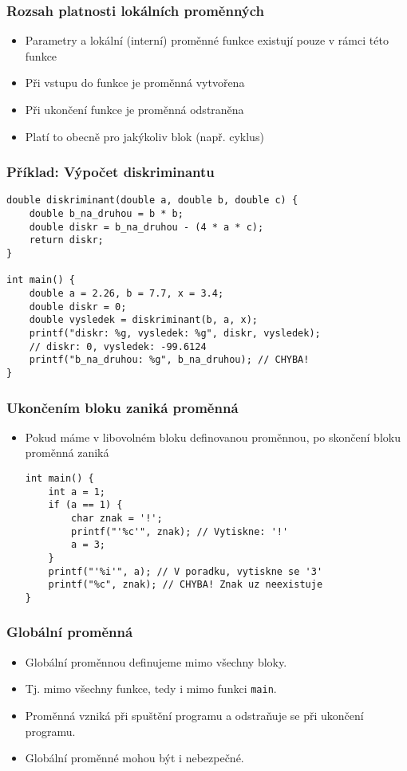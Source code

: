 \documentclass{beamer}
\newenvironment{itemizex}%
  {\large \begin{itemize}%
    \setlength{\itemsep}{8pt}%
    \setlength{\parskip}{8pt}}%
  {\end{itemize}}
\begin{document}
\begin{frame}[t,fragile]\frametitle{Rozsah platnosti lokálních proměnných} 
    \begin{itemizex}
        \item Parametry a lokální (interní) proměnné funkce existují pouze v rámci této funkce
        \item Při vstupu do funkce je proměnná vytvořena
        \item Při ukončení funkce je proměnná odstraněna
        \item Platí to obecně pro jakýkoliv blok (např. cyklus)
    \end{itemizex}
\end{frame}

\begin{frame}[t,fragile]\frametitle{Příklad: Výpočet diskriminantu} 
    \begin{verbatim} 
double diskriminant(double a, double b, double c) {
    double b_na_druhou = b * b;
    double diskr = b_na_druhou - (4 * a * c);
    return diskr;
}

int main() {
    double a = 2.26, b = 7.7, x = 3.4;
    double diskr = 0;
    double vysledek = diskriminant(b, a, x);
    printf("diskr: %g, vysledek: %g", diskr, vysledek);
    // diskr: 0, vysledek: -99.6124
    printf("b_na_druhou: %g", b_na_druhou); // CHYBA!
}
    \end{verbatim}
\end{frame}


\begin{frame}[t,fragile]\frametitle{Ukončením bloku zaniká proměnná} 
    \begin{itemizex}
        \item Pokud máme v libovolném bloku definovanou proměnnou, po skončení bloku proměnná zaniká
        \begin{verbatim} 
int main() {
    int a = 1;
    if (a == 1) {
        char znak = '!';
        printf("'%c'", znak); // Vytiskne: '!'
        a = 3;
    }
    printf("'%i'", a); // V poradku, vytiskne se '3'
    printf("%c", znak); // CHYBA! Znak uz neexistuje
}
        \end{verbatim}
    \end{itemizex}
\end{frame}


\begin{frame}[t,fragile]\frametitle{Globální proměnná} 
    \begin{itemizex}
        \item Globální proměnnou definujeme mimo všechny bloky.
        \item Tj. mimo všechny funkce, tedy i mimo funkci \texttt{main}.
        \item Proměnná vzniká při spuštění programu a odstraňuje se při ukončení programu.
        \item Globální proměnné mohou být i nebezpečné.
    \end{itemizex}
\end{frame}
\end{document}
